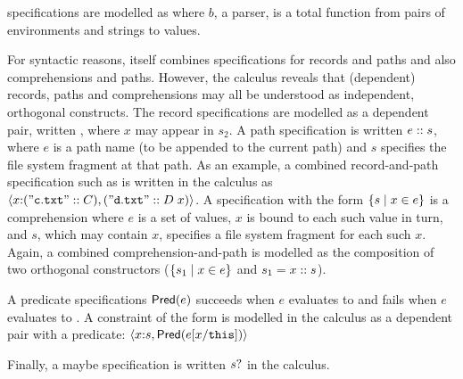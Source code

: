 \padshaskell{} specifications are modelled as
 where $b$, a parser,  is a total
function from pairs of environments and strings to
values.  

For syntactic reasons, \forest{} itself combines specifications
for records and paths and also comprehensions and paths.
However, the calculus reveals that (dependent) records, paths 
and comprehensions
may all be understood as independent, orthogonal constructs.
The record specifications are modelled as a dependent pair,
written , where $x$ may appear in $s_2$.
A path specification is written $e \mathrel{::} s$, where $e$ is
a path name (to be appended to the current path) and 
$s$ specifies the file system fragment at that path.  As an example,
a combined \forest{} record-and-path specification such as
is written in the calculus as
$\langle x {:} (\mathtt{"c.txt"} \mathrel{::} C), (\mathtt{"d.txt"} \mathrel{::} D\; x) \rangle$.
A specification with the form $\{ s \mid x \in e \}$ is a comprehension where
$e$ is a set of values, $x$ is bound to each such value in turn, and
$s$, which may contain $x$, specifies a file system fragment for each
such $x$.  Again, a combined \forest{} comprehension-and-path
\cd{[x :: s | x <- e]} is modelled as the composition of two
orthogonal constructors ($\{ s_1 \mid x \in e \}$ and $s_1 = x \mathrel{::} s$).

A predicate specifications $\mathsf{Pred}(e)$ succeeds
when $e$ evaluates to \True{} and fails when $e$ evaluates
to \False.  A \forest{} constraint of the form 
is modelled in the calculus as a dependent pair with a predicate:
$\langle x {:} s, \mathsf{Pred}(e[x/\mathtt{this}]) \rangle$

Finally, a maybe specification is written $s?$ in the calculus.
 

